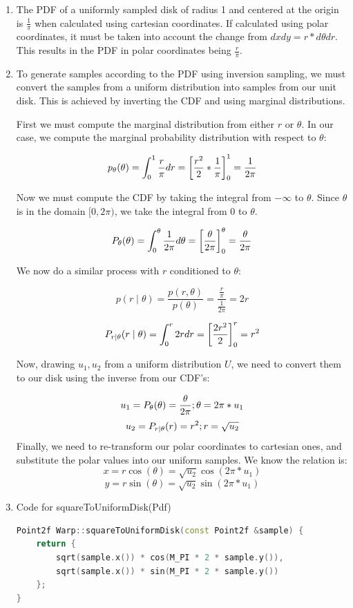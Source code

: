 \begin{enumerate}
  \item    
    The PDF of a uniformly sampled disk of radius 1 and centered at the origin is $\frac{1}{\pi}$ when calculated using cartesian coordinates. If calculated using polar coordinates, it must be taken into account the change from $dxdy = r * d\theta dr$. This results in the PDF in polar coordinates being $\frac{r}{\pi}$.
  
  \item
    To generate samples according to the PDF using inversion sampling, we must convert the samples from a uniform distribution into samples from our unit disk. This is achieved by inverting the CDF and using marginal distributions.
    
    First we must compute the marginal distribution from either $r$ or $\theta$. In our case, we compute the marginal probability distribution with respect to $\theta$:
    
    \[p_{\theta}(\theta)=\int_{0}^{1}\frac{r}{\pi}\space dr = \left[\frac{r^{2}}{2}*\frac{1}{\pi} \right]^{1}_{0} =\frac{1}{2\pi}\]
    
    Now we must compute the CDF by taking the integral from $-\infty$ to $\theta$. Since $\theta$ is in the domain $[0,2\pi)$, we take the integral from $0$ to $\theta$.
    
    \[P_{\theta}(\theta)=\int_{0}^{\theta}\frac{1}{2\pi}\space d\theta = \left[\frac{\theta}{2\pi} \right]^{\theta}_{0} =\frac{\theta}{2\pi}\]

    We now do a similar process with $r$ conditioned to $\theta$:

    \[p(r\mid \theta)=\frac{p(r,\theta)}{p(\theta)}=\frac{\frac{r}{\pi}}{\frac{1}{2\pi}}=2r\]
    
    \[P_{r\mid \theta}(r\mid \theta)=\int_{0}^{r}2r\space dr = \left[\frac{2r^{2}}{2} \right]^{r}_{0} =r^{2}\]
    
    Now, drawing $u_{1}, u_{2}$ from a uniform distribution $U$, we need to convert them to our disk using the inverse from our CDF's:

    \[u_{1}=P_{\theta}(\theta)=\frac{\theta}{2\pi}\space; \space \theta=2\pi*u_{1}\]
    \[u_{2}=P_{{r}\mid{\theta}}(r)=r^{2}\space; \space r=\sqrt{u_{2}}\]
    Finally, we need to re-transform our polar coordinates to cartesian ones, and substitute the polar values into our uniform samples. We know the relation is:
    \[x=r\cos(\theta)=\sqrt{u_{2}}\cos(2\pi*u_{1})\] \[y=r\sin(\theta)=\sqrt{u_{2}}\sin(2\pi*u_{1})\]
  \item Code for squareToUniformDisk(Pdf)
    \begin{lstlisting}[language=C++]
Point2f Warp::squareToUniformDisk(const Point2f &sample) {
    return {
        sqrt(sample.x()) * cos(M_PI * 2 * sample.y()),
        sqrt(sample.x()) * sin(M_PI * 2 * sample.y())
    };
}


\end{lstlisting}
\end{enumerate}
